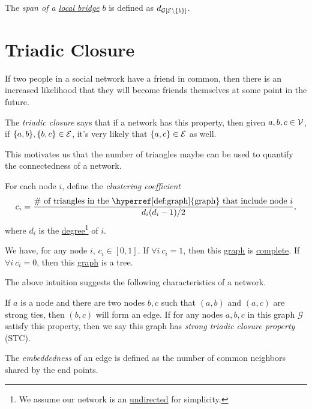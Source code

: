 \begin{definition}
	The \emph{span of a \hyperref[def:local-bridge]{local bridge}} \(b\) is defined as \(d_{\mathcal{G}[\mathcal{\MakeUppercase{e}} \setminus \{b\}]}\).
\end{definition}

\section{Triadic Closure}
\begin{intuition}
	If two people in a social network have a friend in common, then there is an increased likelihood that they will become friends themselves at some point in the future.
\end{intuition}

\begin{eg}
	The \emph{triadic closure} says that if a network has this property, then given \(a, b, c\in \mathcal{\MakeUppercase{v}}\), if \(\{a, b\}, \{b, c\}\in \mathcal{\MakeUppercase{e}} \), it's very likely that \(\{a, c\} \in \mathcal{\MakeUppercase{e}} \) as well.
	\begin{center}
	\end{center}
\end{eg}

This motivates us that the number of triangles maybe can be used to quantify the connectedness of a network.

\begin{definition}\label{def:clustering-coefficient}
	For each node \(i\), define the \emph{clustering coefficient}
	\[
		c_{i} = \dfrac{\#\text{ of triangles in the \hyperref[def:graph]{graph} that include node }i}{d_{i}(d_{i}-1) / 2},
	\]
	where \(d_i\) is the \hyperref[def:degree]{degree}\footnote{We assume our network is an \hyperref[def:undirected-graph]{undirected} for simplicity.} of \(i\).
\end{definition}

\begin{remark}
	We have, for any node \(i\), \(c_{i}\in \left[ 0, 1 \right].\) If \(\forall i\ c_{i} = 1\), then this \hyperref[def:graph]{graph} is \hyperref[def:complete-graph]{complete}. If \(\forall i\ c_{i} = 0\), then this \hyperref[def:graph]{graph} is a tree.
\end{remark}

The above intuition suggests the following characteristics of a network.
\begin{definition}\label{def:strong-triadic-closure}
	If \(a\) is a node and there are two nodes \(b, c\) such that \((a, b)\) and \((a, c)\) are strong ties, then \((b, c)\) will form an edge. If for any nodes \(a, b, c\) in this graph \(\mathcal{G}\) satisfy this property, then we say this graph has \emph{strong triadic closure property} (STC).
\end{definition}

\begin{definition}[Embeddedness]\label{def:embeddedness}
	The \emph{embeddedness} of an edge is defined as the number of common neighbors shared by the end points.
\end{definition}